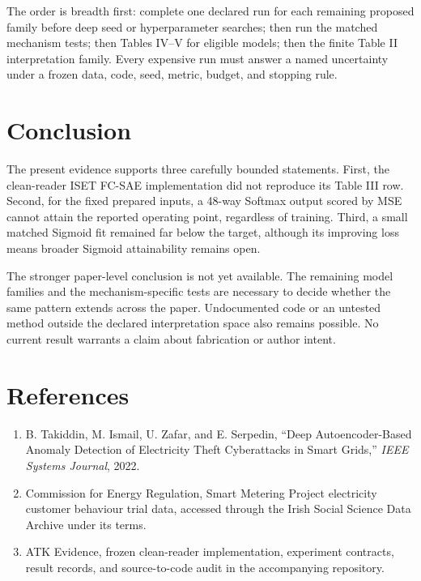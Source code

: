 \documentclass[11pt]{article}
\begin{document}
The order is breadth first: complete one declared run for each remaining
proposed family before deep seed or hyperparameter searches; then run the
matched mechanism tests; then Tables IV--V for eligible models; then the finite
Table II interpretation family. Every expensive run must answer a named
uncertainty under a frozen data, code, seed, metric, budget, and stopping rule.

\section{Conclusion}

The present evidence supports three carefully bounded statements. First, the
clean-reader ISET FC-SAE implementation did not reproduce its Table III row.
Second, for the fixed prepared inputs, a 48-way Softmax output scored by MSE
cannot attain the reported operating point, regardless of training. Third, a
small matched Sigmoid fit remained far below the target, although its improving
loss means broader Sigmoid attainability remains open.

The stronger paper-level conclusion is not yet available. The remaining model
families and the mechanism-specific tests are necessary to decide whether the
same pattern extends across the paper. Undocumented code or an untested method
outside the declared interpretation space also remains possible. No current
result warrants a claim about fabrication or author intent.

\section*{References}

\begin{enumerate}
  \item B. Takiddin, M. Ismail, U. Zafar, and E. Serpedin, ``Deep
  Autoencoder-Based Anomaly Detection of Electricity Theft Cyberattacks in
  Smart Grids,'' \emph{IEEE Systems Journal}, 2022.
  \item Commission for Energy Regulation, Smart Metering Project electricity
  customer behaviour trial data, accessed through the Irish Social Science Data
  Archive under its terms.
  \item ATK Evidence, frozen clean-reader implementation, experiment contracts,
  result records, and source-to-code audit in the accompanying repository.
\end{enumerate}
\end{document}
